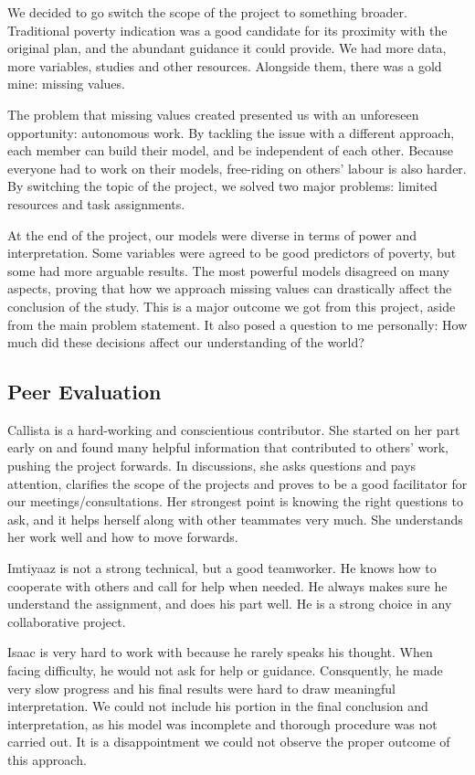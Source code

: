 \documentclass[10pt,a4paper]{article}
\begin{document}
We decided to go switch the scope of the project to something broader. Traditional poverty indication was a good candidate for its proximity with the original plan, and the abundant guidance it could provide. We had more data, more variables, studies and other resources. Alongside them, there was a gold mine: missing values. 

The problem that missing values created presented us with an unforeseen opportunity: autonomous work. By tackling the issue with a different approach, each member can build their model, and be independent of each other. Because everyone had to work on their models, free-riding on others' labour is also harder. By switching the topic of the project, we solved two major problems: limited resources and task assignments.

At the end of the project, our models were diverse in terms of power and interpretation. Some variables were agreed to be good predictors of poverty, but some had more arguable results. The most powerful models disagreed on many aspects, proving that how we approach missing values can drastically affect the conclusion of the study. This is a major outcome we got from this project, aside from the main problem statement. It also posed a question to me personally: How much did these decisions affect our understanding of the world?

\subsection{Peer Evaluation}

Callista is a hard-working and conscientious contributor. She started on her part early on and found many helpful information that contributed to others' work, pushing the project forwards. In discussions, she asks questions and pays attention, clarifies the scope of the projects and proves to be a good facilitator for our meetings/consultations. Her strongest point is knowing the right questions to ask, and it helps herself along with other teammates very much. She understands her work well and how to move forwards.

Imtiyaaz is not a strong technical, but a good teamworker. He knows how to cooperate with others and call for help when needed. He always makes sure he understand the assignment, and does his part well. He is a strong choice in any collaborative project.

Isaac is very hard to work with because he rarely speaks his thought. When facing difficulty, he would not ask for help or guidance. Consquently, he made very slow progress and his final results were hard to draw meaningful interpretation. We could not include his portion in the final conclusion and interpretation, as his model was incomplete and thorough procedure was not carried out. It is a disappointment we could not observe the proper outcome of this approach.
\end{document}
